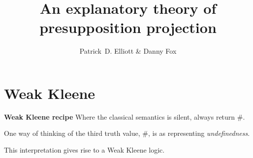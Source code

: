 \documentclass[nols,twoside,nofonts,nobib,nohyper]{tufte-handout}
\title{An explanatory theory of presupposition projection}
\author[Patrick D. Elliott \& Danny Fox]{Patrick~D. Elliott \& Danny Fox}
\theoremstyle{definition}
\begin{document}
\maketitle%

\section{Weak Kleene}

\begin{tcolorbox}
  \textbf{Weak Kleene recipe}
  \tcblower
  Where the classical semantics is silent, always return \#.
\end{tcolorbox}

One way of thinking of the third truth value, \#, is as representing \textit{undefinedness}.

This interpretation gives rise to a Weak Kleene logic.
\end{document}
